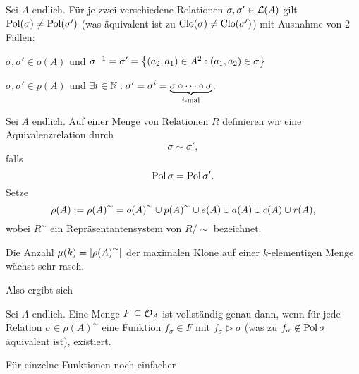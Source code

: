 \documentclass{book}
\begin{document}
\begin{remark}
    Sei $A$ endlich. Für je zwei verschiedene Relationen $\sigma, \sigma'\in\mathcal{L}(A)$ gilt $\mathop\mathrm{Pol}(\sigma)\neq \mathop\mathrm{Pol}(\sigma')$ (was äquivalent ist zu $\mathrm{Clo}(\sigma)\neq\mathrm{Clo}(\sigma')$) mit Ausnahme von $2$ Fällen:
    \begin{statements}
            \item $\sigma,\sigma'\in o(A)$ und $\sigma^{-1}=\sigma'=\left\{(a_2,a_1)\in A^2:(a_1,a_2)\in \sigma\right\}$
            \item $\sigma,\sigma'\in p(A)$ und $\exists i\in \mathbb{N}:\sigma'=\sigma^i=\underbrace{\sigma\circ \cdots \circ\sigma}_{\textrm{$i$-mal}}$.
    \end{statements}
\end{remark}

\begin{definition}
    Sei $A$ endlich. Auf einer Menge von Relationen $R$ definieren wir eine Äquivalenzrelation durch
    $$
    \sigma\sim\sigma',
    $$
    falls
    $$
    \mathop\mathrm{Pol}\sigma = \mathop\mathrm{Pol}\sigma'.
    $$
    Setze
    $$
    \tilde\rho(A):={\rho(A)}^{\sim}={o(A)}^{\sim}\cup {p(A)}^{\sim}\cup e(A)\cup a(A)\cup c(A)\cup r(A),
    $$
    wobei $R^{\sim}$ ein Repräsentantensystem von $R/\sim$ bezeichnet.
\end{definition}

\begin{remark}
    Die Anzahl $\mu(k)=\left|{\rho(A)}^{\sim}\right|$ der maximalen Klone auf einer $k$-elementigen Menge wächst sehr rasch.
\end{remark}

Also ergibt sich
\def\preserves{\rhd}%
\begin{corollary}
    Sei $A$ endlich. Eine Menge $F\subseteq \mathcal{O}_A$ ist vollständig genau dann, wenn für jede Relation $\sigma\in{\rho(A)}^{\sim}$ eine Funktion $f_\sigma\in F$ mit $f_\sigma\preserves\sigma$ (was zu $f_\sigma\not\in \mathop\mathrm{Pol}\sigma$ äquivalent ist), existiert.
\end{corollary}

Für einzelne Funktionen noch einfacher
\end{document}
